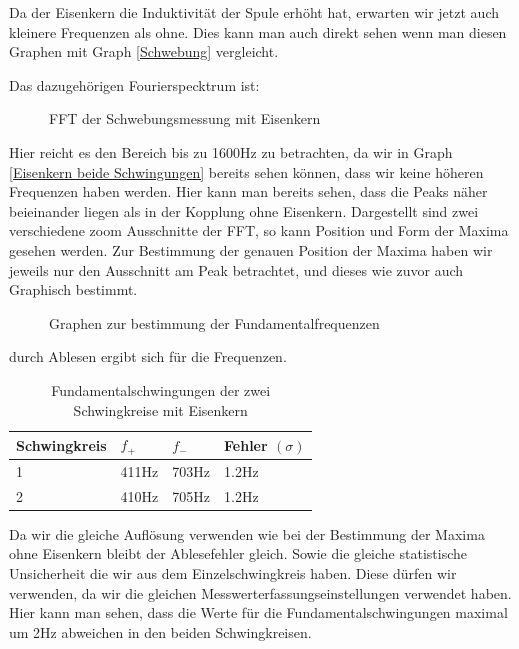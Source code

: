 \documentclass[twoside]{protokoll}
\begin{document}
Da der Eisenkern die Induktivität der Spule erhöht hat, erwarten wir jetzt auch kleinere Frequenzen als ohne. Dies kann man auch direkt sehen wenn man diesen Graphen mit Graph \ref{Schwebung} vergleicht. 

Das dazugehörigen Fourierspecktrum ist:

\begin{figure}[H]
    \centering
    \hfill
    \caption{FFT der Schwebungsmessung mit Eisenkern }
\end{figure}

Hier reicht es den Bereich bis zu 1600Hz zu betrachten, da wir in Graph \ref{Eisenkern beide Schwingungen} bereits sehen können, dass wir keine höheren Frequenzen haben werden. Hier kann man bereits sehen, dass die Peaks näher beieinander liegen als in der Kopplung ohne Eisenkern.
Dargestellt sind zwei verschiedene zoom Ausschnitte der FFT, so kann Position und Form der Maxima gesehen werden.
 Zur Bestimmung der genauen Position der Maxima haben wir jeweils nur den Ausschnitt am Peak betrachtet, und dieses wie zuvor auch Graphisch bestimmt.

\begin{figure}[H]
    \centering
    \hfill
    \caption{Graphen zur bestimmung der Fundamentalfrequenzen}
\end{figure}

durch Ablesen ergibt sich für die Frequenzen.

\begin{table}[H]
    \centering
    \begin{tabularx}{1\textwidth}{X X X X} %
        \toprule
        \textbf{Schwingkreis} & \textbf{$f_+$ } & \textbf{$f_-$ } & \textbf{Fehler $(\sigma)$}\\
        \midrule
        1 & 411Hz & 703Hz & 1.2Hz\\
        2 & 410Hz & 705Hz & 1.2Hz\\
        \bottomrule
    \end{tabularx}
    \caption{Fundamentalschwingungen der zwei Schwingkreise mit Eisenkern}
    \label{•}
\end{table}

Da wir die gleiche Auflösung verwenden wie bei der Bestimmung der Maxima ohne Eisenkern bleibt der Ablesefehler gleich. Sowie die gleiche statistische Unsicherheit die wir aus dem Einzelschwingkreis haben. Diese dürfen wir verwenden, da wir die gleichen Messwerterfassungseinstellungen verwendet haben. 
Hier kann man sehen, dass die Werte für die Fundamentalschwingungen maximal um 2Hz abweichen in den beiden Schwingkreisen.
\end{document}
